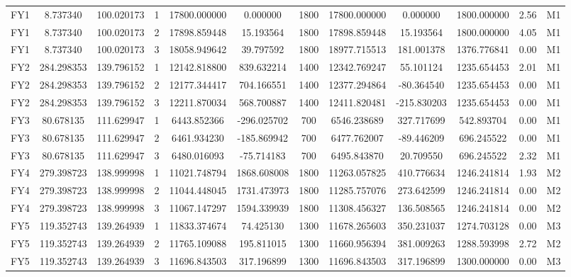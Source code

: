 \documentclass[12pt,a4paper]{article}
\begin{document}
\begin{longtable}{c|c|c|c|c|c|c|c|c|c|c|c}
		FY1 & 8.737340 & 100.020173 & 1 & 17800.000000 & 0.000000 & 1800 & 17800.000000 & 0.000000 & 1800.000000 & 2.56 & M1 \\
		FY1 & 8.737340 & 100.020173 & 2 & 17898.859448 & 15.193564 & 1800 & 17898.859448 & 15.193564 & 1800.000000 & 4.05 & M1 \\
		FY1 & 8.737340 & 100.020173 & 3 & 18058.949642 & 39.797592 & 1800 & 18977.715513 & 181.001378 & 1376.776841 & 0.00 & M1 \\
		FY2 & 284.298353 & 139.796152 & 1 & 12142.818800 & 839.632214 & 1400 & 12342.769247 & 55.101124 & 1235.654453 & 2.01 & M1 \\
		FY2 & 284.298353 & 139.796152 & 2 & 12177.344417 & 704.166551 & 1400 & 12377.294864 & -80.364540 & 1235.654453 & 0.00 & M1 \\
		FY2 & 284.298353 & 139.796152 & 3 & 12211.870034 & 568.700887 & 1400 & 12411.820481 & -215.830203 & 1235.654453 & 0.00 & M1 \\
		FY3 & 80.678135 & 111.629947 & 1 & 6443.852366 & -296.025702 & 700 & 6546.238689 & 327.717699 & 542.893704 & 0.00 & M1 \\
		FY3 & 80.678135 & 111.629947 & 2 & 6461.934230 & -185.869942 & 700 & 6477.762007 & -89.446209 & 696.245522 & 0.00 & M1 \\
		FY3 & 80.678135 & 111.629947 & 3 & 6480.016093 & -75.714183 & 700 & 6495.843870 & 20.709550 & 696.245522 & 2.32 & M1 \\
		FY4 & 279.398723 & 138.999998 & 1 & 11021.748794 & 1868.608008 & 1800 & 11263.057825 & 410.776634 & 1246.241814 & 1.93 & M2 \\
		FY4 & 279.398723 & 138.999998 & 2 & 11044.448045 & 1731.473973 & 1800 & 11285.757076 & 273.642599 & 1246.241814 & 0.00 & M2 \\
		FY4 & 279.398723 & 138.999998 & 3 & 11067.147297 & 1594.339939 & 1800 & 11308.456327 & 136.508565 & 1246.241814 & 0.00 & M2 \\
		FY5 & 119.352743 & 139.264939 & 1 & 11833.374674 & 74.425130 & 1300 & 11678.265603 & 350.231037 & 1274.703128 & 0.00 & M3 \\
		FY5 & 119.352743 & 139.264939 & 2 & 11765.109088 & 195.811015 & 1300 & 11660.956394 & 381.009263 & 1288.593998 & 2.72 & M2 \\
		FY5 & 119.352743 & 139.264939 & 3 & 11696.843503 & 317.196899 & 1300 & 11696.843503 & 317.196899 & 1300.000000 & 0.00 & M3 \\
		
	\end{longtable}
	
\end{document}
